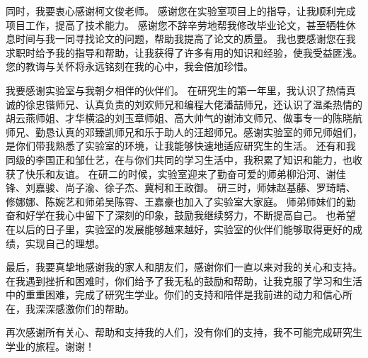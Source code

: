 \documentclass[algorithmlist, AutoFakeBold, AutoFakeSlant, figurelist, tablelist, nomlist, engineering, openany]{seuthesix} %
\begin{document}
同时，我要衷心感谢柯文俊老师。
感谢您在实验室项目上的指导，让我顺利完成项目工作，提高了技术能力。
感谢您不辞辛劳地帮我修改毕业论文，甚至牺牲休息时间与我一同寻找论文的问题，帮助我提高了论文的质量。
我也要感谢您在我求职时给予我的指导和帮助，让我获得了许多有用的知识和经验，使我受益匪浅。
您的教诲与关怀将永远铭刻在我的心中，我会倍加珍惜。

我要感谢实验室与我朝夕相伴的伙伴们。
在研究生的第一年里，我认识了热情真诚的徐忠锴师兄、认真负责的刘欢师兄和编程大佬潘喆师兄，还认识了温柔热情的胡云燕师姐、才华横溢的刘玉章师姐、高大帅气的谢沛文师兄、做事专一的陈晓航师兄、勤恳认真的邓臻凯师兄和乐于助人的汪超师兄。感谢实验室的师兄师姐们，是你们带我熟悉了实验室的环境，让我能够快速地适应研究生的生活。
还有和我同级的李国正和邹仕艺，在与你们共同的学习生活中，我积累了知识和能力，也收获了快乐和友谊。
在研二的时候，实验室迎来了勤奋可爱的师弟柳沿河、谢佳锋、刘嘉骏、尚子渝、徐子杰、冀柯和王政御。
研三时，师妹赵基藤、罗琦晴、修娜娜、陈婉艺和师弟吴陈霄、王嘉豪也加入了实验室大家庭。
师弟师妹们的勤奋和好学在我心中留下了深刻的印象，鼓励我继续努力，不断提高自己。
也希望在以后的日子里，实验室的发展能够越来越好，实验室的伙伴们能够取得更好的成绩，实现自己的理想。

最后，我要真挚地感谢我的家人和朋友们，感谢你们一直以来对我的关心和支持。在我遇到挫折和困难时，你们给予了我无私的鼓励和帮助，让我克服了学习和生活中的重重困难，完成了研究生学业。你们的支持和陪伴是我前进的动力和信心所在，我深深感激你们的帮助。

再次感谢所有关心、帮助和支持我的人们，没有你们的支持，我不可能完成研究生学业的旅程。谢谢！


% 
% 
% 
\end{document}
